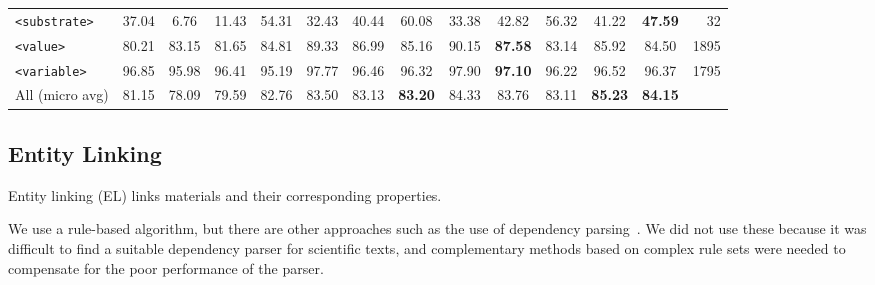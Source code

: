 \begin{table}[ht]
{\begin{tabular}{l ccc ccc ccc ccc r}
        \texttt{<substrate>}   & 37.04                            & 6.76                                      & 11.43                                              & 54.31      & 32.43      & 40.44          & 60.08          & 33.38      & 42.82          & 56.32      & 41.22          & \textbf{47.59} & 32   \\
        \texttt{<value>}       & 80.21                            & 83.15                                     & 81.65                                              & 84.81      & 89.33      & 86.99          & 85.16          & 90.15      & \textbf{87.58} & 83.14      & 85.92          & 84.50          & 1895 \\
        \texttt{<variable>}    & 96.85                            & 95.98                                     & 96.41                                              & 95.19      & 97.77      & 96.46          & 96.32          & 97.90      & \textbf{97.10} & 96.22      & 96.52          & 96.37          & 1795 \\
        \midrule
        All (micro avg)        & 81.15                            & 78.09                                     & 79.59                                              & 82.76      & 83.50      & 83.13          & \textbf{83.20} & 84.33      & 83.76          & 83.11      & \textbf{85.23} & \textbf{84.15} &      \\
        \bottomrule
    \end{tabular}
}
    
    \label{tab:evaluation-10fold-material-parser}
\end{table}

\subsection{Entity Linking}
\label{subsubsec:linking}

Entity linking (EL) links materials and their corresponding properties.

We use a rule-based algorithm, but there are other approaches such as the use of dependency parsing~\cite{yoshikawa:2017acl, Tiktinsky2020pyBARTES, swayamdipta:17, zhou-zhao-2019-head}. We did not use these because it was difficult to find a suitable dependency parser for scientific texts, and complementary methods based on complex rule sets were needed to compensate for the poor performance of the parser.

